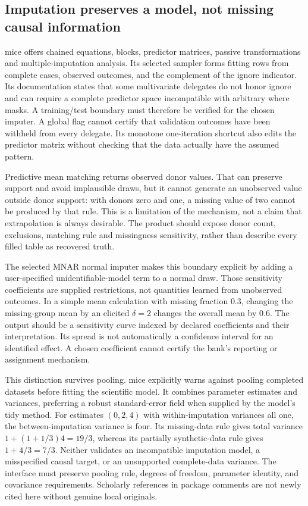 \subsection{Imputation preserves a model, not missing causal information}

mice offers chained equations, blocks, predictor matrices, passive transformations and multiple-imputation analysis. Its selected sampler forms fitting rows from complete cases, observed outcomes, and the complement of the ignore indicator. Its documentation states that some multivariate delegates do not honor ignore and can require a complete predictor space incompatible with arbitrary where masks. A training/test boundary must therefore be verified for the chosen imputer. A global flag cannot certify that validation outcomes have been withheld from every delegate. Its monotone one-iteration shortcut also edits the predictor matrix without checking that the data actually have the assumed pattern.~\citep{exec25_rtm_mice}

Predictive mean matching returns observed donor values. That can preserve support and avoid implausible draws, but it cannot generate an unobserved value outside donor support: with donors zero and one, a missing value of two cannot be produced by that rule. This is a limitation of the mechanism, not a claim that extrapolation is always desirable. The product should expose donor count, exclusions, matching rule and missingness sensitivity, rather than describe every filled table as recovered truth.~\citep{exec25_rtm_mice,exec25_rtm_choice}

The selected MNAR normal imputer makes this boundary explicit by adding a user-specified unidentifiable-model term to a normal draw. Those sensitivity coefficients are supplied restrictions, not quantities learned from unobserved outcomes. In a simple mean calculation with missing fraction $0.3$, changing the missing-group mean by an elicited $\delta=2$ changes the overall mean by $0.6$. The output should be a sensitivity curve indexed by declared coefficients and their interpretation. Its spread is not automatically a confidence interval for an identified effect. A chosen coefficient cannot certify the bank's reporting or assignment mechanism.~\citep{exec25_rtm_mice,exec25_rtm_choice}

This distinction survives pooling. mice explicitly warns against pooling completed datasets before fitting the scientific model. It combines parameter estimates and variances, preferring a robust standard-error field when supplied by the model's tidy method. For estimates $(0,2,4)$ with within-imputation variances all one, the between-imputation variance is four. Its missing-data rule gives total variance $1+(1+1/3)4=19/3$, whereas its partially synthetic-data rule gives $1+4/3=7/3$. Neither validates an incompatible imputation model, a misspecified causal target, or an unsupported complete-data variance. The interface must preserve pooling rule, degrees of freedom, parameter identity, and covariance requirements. Scholarly references in package comments are not newly cited here without genuine local originals.~\citep{exec25_rtm_mice,exec25_rtm_choice}

